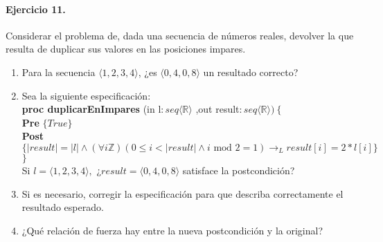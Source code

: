 \documentclass[a4paper]{article}
\begin{document}
\paragraph*{Ejercicio 11.} Considerar el problema de, dada una secuencia de números reales, devolver la que resulta de duplicar sus valores en las posiciones impares.
	\begin{enumerate}[label=\alph*)]
		\item Para la secuencia $\langle 1,2,3,4\rangle$, ¿es $\langle 0,4,0,8\rangle$
				 un resultado correcto?
		\item Sea la siguiente especificación:\medskip \\
			\textbf{proc duplicarEnImpares }(in l$: seq\langle \mathbb{R}\rangle$
				,out result$:seq\langle \mathbb{R}\rangle )\ \{$\smallskip \\
			\hspace*{6mm} \textbf{Pre }$\{ True\}$\smallskip \\
			\hspace*{6mm} \textbf{Post }$\{|result|=|l|\wedge (\forall i\mathbb{Z})
					(0\leq i < |result|\wedge i\textrm{ mod }2=1)\rightarrow_L 
					result[i]=2*l[i]\}$\\
			$\}$\medskip \\
			Si $l=\langle 1,2,3,4\rangle ,$ ¿$result=\langle 0,4,0,8\rangle$ satisface
			la postcondición?
		\item Si es necesario, corregir la especificación para que describa correctamente
				el resultado esperado.
		\item ¿Qué relación de fuerza hay entre la nueva postcondición y la original?
	\end{enumerate}
\end{document}
